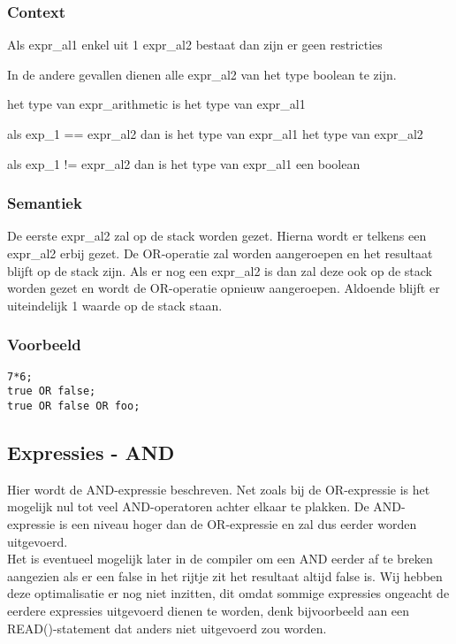 \documentclass[]{article}
\begin{document}
\subsubsection{Context}
\begin{list}{•}{•}
\item Als expr\_al1 enkel uit 1 expr\_al2 bestaat dan zijn er geen restricties
\item In de andere gevallen dienen alle expr\_al2 van het type boolean te zijn.
\item het type van expr\_arithmetic is het type van expr\_al1
\item als exp\_1 == expr\_al2 dan is het type van expr\_al1 het type van expr\_al2
\item als exp\_1 != expr\_al2 dan is het type van expr\_al1 een boolean
\end{list}
\subsubsection{Semantiek}
De eerste expr\_al2 zal op de stack worden gezet. Hierna wordt er telkens een expr\_al2 erbij gezet. De OR-operatie zal worden aangeroepen en het resultaat blijft op de stack zijn. Als er nog een expr\_al2 is dan zal deze ook op de stack worden gezet en wordt de OR-operatie opnieuw aangeroepen. Aldoende blijft er uiteindelijk 1 waarde op de stack staan.
\subsubsection{Voorbeeld}
\begin{lstlisting}[style=SELMA]
7*6;
true OR false;
true OR false OR foo;
\end{lstlisting}

\subsection{Expressies - AND}
Hier wordt de AND-expressie beschreven. Net zoals bij de OR-expressie is het mogelijk nul tot veel AND-operatoren achter elkaar te plakken. De AND-expressie is een niveau hoger dan de OR-expressie en zal dus eerder worden uitgevoerd. \\
Het is eventueel mogelijk later in de compiler om een AND eerder af te breken aangezien als er een false in het rijtje zit het resultaat altijd false is. Wij hebben deze optimalisatie er nog niet inzitten, dit omdat sommige expressies ongeacht de eerdere expressies uitgevoerd dienen te worden, denk bijvoorbeeld aan een READ()-statement dat anders niet uitgevoerd zou worden.
\end{document}
